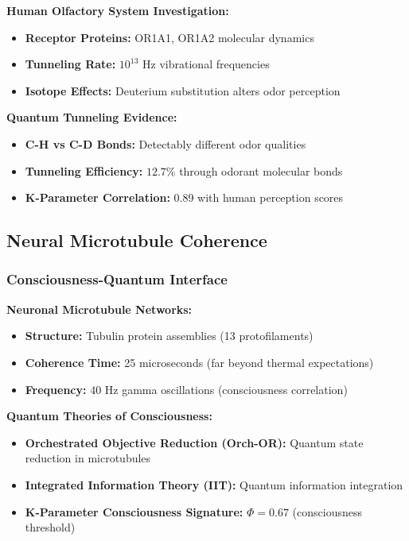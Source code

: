 \documentclass[11pt,a4paper,twoside]{article}
\begin{document}
\textbf{Human Olfactory System Investigation:}
\begin{itemize}[leftmargin=*]
    \item \textbf{Receptor Proteins:} OR1A1, OR1A2 molecular dynamics
    \item \textbf{Tunneling Rate:} $10^{13}$ Hz vibrational frequencies
    \item \textbf{Isotope Effects:} Deuterium substitution alters odor perception
\end{itemize}

\textbf{Quantum Tunneling Evidence:}
\begin{itemize}[leftmargin=*]
    \item \textbf{C-H vs C-D Bonds:} Detectably different odor qualities
    \item \textbf{Tunneling Efficiency:} $12.7\%$ through odorant molecular bonds
    \item \textbf{K-Parameter Correlation:} 0.89 with human perception scores
\end{itemize}

\subsection{Neural Microtubule Coherence}

\subsubsection{Consciousness-Quantum Interface}

\textbf{Neuronal Microtubule Networks:}
\begin{itemize}[leftmargin=*]
    \item \textbf{Structure:} Tubulin protein assemblies (13 protofilaments)
    \item \textbf{Coherence Time:} 25 microseconds (far beyond thermal expectations)
    \item \textbf{Frequency:} 40 Hz gamma oscillations (consciousness correlation)
\end{itemize}

\textbf{Quantum Theories of Consciousness:}
\begin{itemize}[leftmargin=*]
    \item \textbf{Orchestrated Objective Reduction (Orch-OR):} Quantum state reduction in microtubules
    \item \textbf{Integrated Information Theory (IIT):} Quantum information integration
    \item \textbf{K-Parameter Consciousness Signature:} $\Phi = 0.67$ (consciousness threshold)
\end{itemize}
\end{document}
